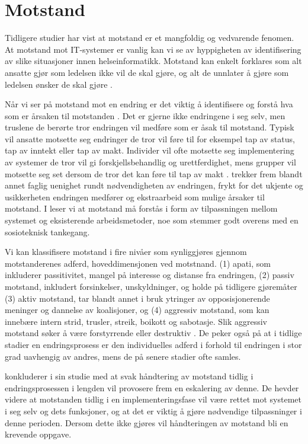 \section{Motstand}
\label{sec:motstand}

Tidligere studier har vist at motstand er et mangfoldig og vedvarende fenomen. At motstand mot IT-systemer er vanlig kan vi se av hyppigheten av identifisering av slike situasjoner innen helseinformatikk.  Motstand kan enkelt forklares som alt ansatte gjør som ledelsen ikke vil de skal gjøre, og alt de unnlater å gjøre som ledelsen ønsker de skal gjøre \citep{Timmons03}.

\noindent
Når vi ser på motstand mot en endring er det viktig å identifisere og forstå hva som er årsaken til motstanden \citep{Lapointe05}. Det er gjerne ikke endringene i seg selv, men truslene de berørte tror endringen vil medføre som er åsak til motstand. Typisk vil ansatte motsette seg endringer de tror vil føre til for eksempel tap av status, tap av inntekt eller tap av makt. Individer vil ofte motsette seg implementering av systemer de tror vil gi forskjellsbehandlig og urettferdighet, mens grupper vil motsette seg set dersom de tror det kan føre til tap av makt \citep{Lapointe05}. \citet{Jacobsen12} trekker frem blandt annet faglig uenighet rundt nødvendigheten av endringen, frykt for det ukjente og usikkerheten endringen medfører og  ekstraarbeid som mulige årsaker til motstand. I \citep{Timmons03} leser vi at motstand må forstås i form av tilpassningen mellom systemet og eksisterende arbeidsmetoder, noe som stemmer godt overens med en sosioteknisk tankegang.

\noindent
Vi kan klassifisere motstand i fire nivåer som synliggjøres gjennom motstanderenes adferd, hoveddimensjonen ved motstnand. (1) apati, som inkluderer passitivitet, mangel på interesse og distanse fra endringen, (2) passiv motstand, inkludert forsinkelser, unskyldninger, og holde på tidligere gjøremåter (3) aktiv motstand, tar blandt annet i bruk ytringer av opposisjonerende meninger og dannelse av koalisjoner, og (4) aggressiv motstand, som kan innebære intern strid, trusler, streik, boikott og sabotasje. Slik aggressiv motstand søker å være forstyrrende eller destruktiv \citep{Lapointe05}. De peker også på at i tidlige stadier en endringsprosess er den individuelles adferd i forhold til endringen i stor grad uavhengig av andres, mens de på senere stadier ofte samles.

\noindent
\citet{Lapointe05} konkluderer i sin studie med at svak håndtering av motstand tidlig i endringsprosessen i lengden vil provosere frem en eskalering av denne. De hevder videre at motstanden tidlig i en implementeringsfase vil være rettet mot systemet i seg selv og dets funksjoner, og at det er viktig å gjøre nødvendige tilpassninger i denne perioden. Dersom dette ikke gjøres vil håndteringen av motstand bli en krevende oppgave.

